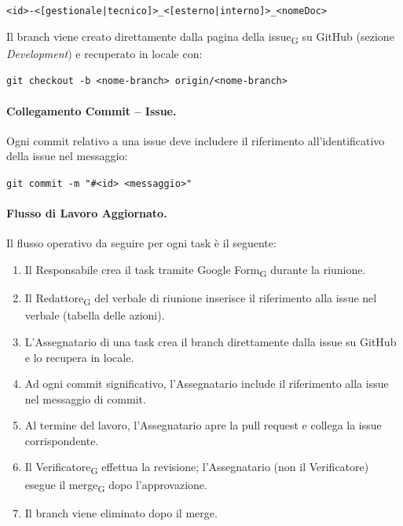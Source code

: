 \begin{center}
	\texttt{<id>-<[gestionale|tecnico]>\_<[esterno|interno]>\_<nomeDoc>}
\end{center}
 
Il branch viene creato direttamente dalla pagina della issue\textsubscript{G} su GitHub
(sezione \textit{Development}) e recuperato in locale con:
 
\begin{center}
	\texttt{git checkout -b <nome-branch> origin/<nome-branch>}
\end{center}
 
\paragraph{Collegamento Commit -- Issue.}
Ogni commit relativo a una issue deve includere il riferimento all'identificativo
della issue nel messaggio:
 
\begin{center}
	\texttt{git commit -m "\#<id> <messaggio>"}
\end{center}
 
\paragraph{Flusso di Lavoro Aggiornato.}
Il flusso operativo da seguire per ogni task è il seguente:
 
\begin{enumerate}
	\item Il Responsabile crea il task tramite Google Form\textsubscript{G} durante la riunione.
	\item Il Redattore\textsubscript{G} del verbale di riunione inserisce il riferimento alla issue nel verbale
	      (tabella delle azioni).
	\item L'Assegnatario di una task crea il branch direttamente dalla issue su GitHub e
	      lo recupera in locale.
	\item Ad ogni commit significativo, l'Assegnatario include il riferimento
	      alla issue nel messaggio di commit.
	\item Al termine del lavoro, l'Assegnatario apre la pull request e collega
	      la issue corrispondente.
	\item Il Verificatore\textsubscript{G} effettua la revisione; l'Assegnatario (non il Verificatore)
	      esegue il merge\textsubscript{G} dopo l'approvazione.
	\item Il branch viene eliminato dopo il merge.
\end{enumerate}
 
